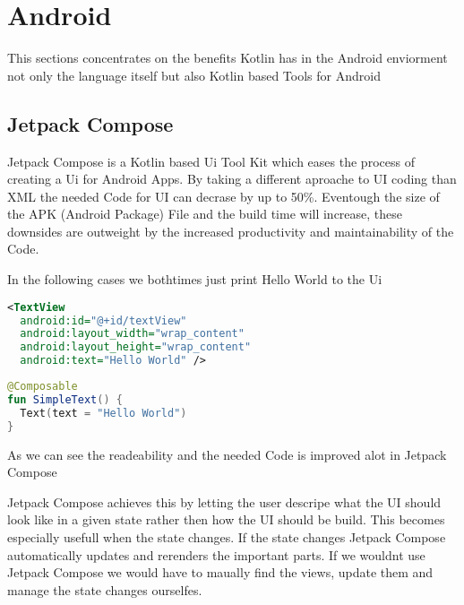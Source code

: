 \documentclass[a4paper,11pt]{article}
\begin{document}
\section{Android}
This sections concentrates on the benefits Kotlin has in the Android enviorment not only the language itself but also Kotlin based Tools for Android %

\subsection{Jetpack Compose}
Jetpack Compose is a Kotlin based Ui Tool Kit which eases the process of creating a Ui for Android Apps. By taking a different aproache to UI coding than XML the needed Code for UI can decrase by up to 50\%. Eventough the size of the APK (Android Package) File and the build time will increase, these downsides are outweight by the increased productivity and maintainability of the Code.

In the following cases we bothtimes just print Hello World to the Ui
\begin{lstlisting}[language=xml, title= {XML Hello World}]
<TextView
  android:id="@+id/textView"
  android:layout_width="wrap_content"
  android:layout_height="wrap_content"
  android:text="Hello World" />
\end{lstlisting}
\begin{lstlisting}[language=Kotlin, title= {Jetpack Compose Hello World}]
@Composable
fun SimpleText() {
  Text(text = "Hello World")
}
\end{lstlisting}
As we can see the readeability and the needed Code is improved alot in Jetpack Compose

Jetpack Compose achieves this by letting the user descripe what the UI should look like in a given state rather then how the UI should be build. This becomes especially usefull when the state changes. If the state changes Jetpack Compose automatically updates and rerenders the important parts. If we wouldnt use Jetpack Compose we would have to maually find the views, update them and manage the state changes ourselfes.
\end{document}
